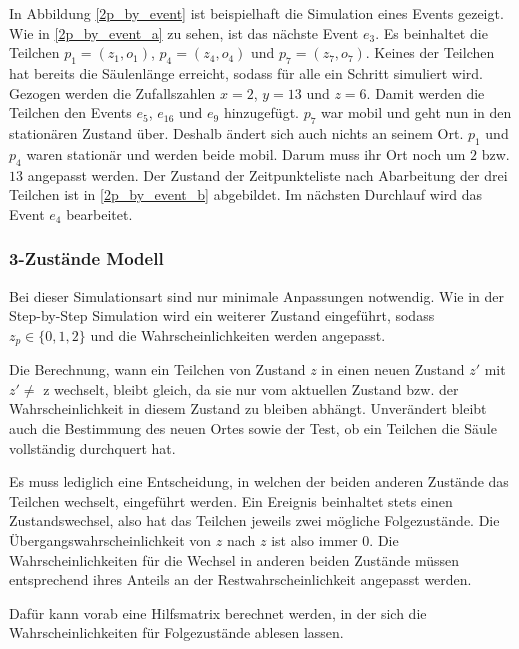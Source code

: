 In Abbildung \ref{2p_by_event} ist beispielhaft die Simulation eines Events gezeigt. Wie in \ref{2p_by_event_a} zu sehen, ist das nächste Event $e_3$. Es beinhaltet die Teilchen $p_1 = (z_1, o_1)$, $p_4 = (z_4, o_4)$ und $p_7 = (z_7, o_7)$. Keines der Teilchen hat bereits die Säulenlänge erreicht, sodass für alle ein Schritt simuliert wird. Gezogen werden die Zufallszahlen $x=2$, $y=13$ und $z=6$. Damit werden die Teilchen den Events $e_5$, $e_{16}$ und $e_9$ hinzugefügt. $p_{7}$ war mobil und geht nun in den stationären Zustand über. Deshalb ändert sich auch nichts an seinem Ort. $p_1$ und $p_4$ waren stationär und werden beide mobil. Darum muss ihr Ort noch um $2$ bzw. $13$ angepasst werden. Der Zustand der Zeitpunkteliste nach Abarbeitung der drei Teilchen ist in \ref{2p_by_event_b} abgebildet. Im nächsten Durchlauf wird das Event $e_4$ bearbeitet.




\subsubsection{3-Zustände Modell}
Bei dieser Simulationsart sind nur minimale Anpassungen notwendig. Wie in der Step-by-Step Simulation wird ein weiterer Zustand eingeführt, sodass $z_p \in \{0,1,2\}$ und die Wahrscheinlichkeiten werden angepasst.

Die Berechnung, wann ein Teilchen von Zustand $z$ in einen neuen Zustand $z'$ mit $z' \neq $ z wechselt, bleibt gleich, da sie nur vom aktuellen Zustand bzw. der Wahrscheinlichkeit in diesem Zustand zu bleiben abhängt. Unverändert bleibt auch die Bestimmung des neuen Ortes sowie der Test, ob ein Teilchen die Säule vollständig durchquert hat. 

Es muss lediglich eine Entscheidung, in welchen der beiden anderen Zustände das Teilchen wechselt, eingeführt werden. Ein Ereignis beinhaltet stets einen Zustandswechsel, also hat das Teilchen jeweils zwei mögliche Folgezustände. Die Übergangswahrscheinlichkeit von $z$ nach $z$ ist also immer $0$. Die Wahrscheinlichkeiten für die Wechsel in anderen beiden Zustände müssen entsprechend ihres Anteils an der Restwahrscheinlichkeit angepasst werden.

Dafür kann vorab eine Hilfsmatrix berechnet werden, in der sich die Wahrscheinlichkeiten für Folgezustände ablesen lassen.

